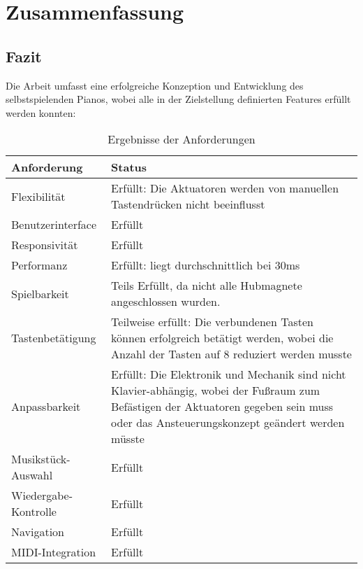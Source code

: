 
\chapter{Zusammenfassung} \label{fazit}

\section{Fazit}
Die Arbeit umfasst eine erfolgreiche Konzeption und Entwicklung des selbstspielenden Pianos, wobei alle in der Zielstellung
definierten Features erfüllt werden konnten: \newline

\begin{table}[htbp]
    \centering
    \begin{tabular}{|m{4cm}|m{8cm}|}
        \hline
        \textbf{Anforderung} &  \textbf{Status}  \\
        \hline
        Flexibilität & Erfüllt: Die Aktuatoren werden von manuellen Tastendrücken nicht beeinflusst \\
        \hline
        Benutzerinterface & Erfüllt \\
        \hline
        Responsivität & Erfüllt \\
        \hline
        Performanz & Erfüllt: liegt durchschnittlich bei 30ms \\
        \hline
        Spielbarkeit & Teils Erfüllt, da nicht alle Hubmagnete angeschlossen wurden. \\
        \hline
        Tastenbetätigung & Teilweise erfüllt: Die verbundenen Tasten können erfolgreich betätigt werden, wobei die Anzahl der Tasten auf
        8 reduziert werden musste \\
        \hline
        Anpassbarkeit & Erfüllt: Die Elektronik und Mechanik sind nicht Klavier-abhängig, wobei der Fußraum zum Befästigen der Aktuatoren
        gegeben sein muss oder das Ansteuerungskonzept geändert werden müsste\\
        \hline
        Musikstück-Auswahl & Erfüllt \\
        \hline
        Wiedergabe-Kontrolle & Erfüllt \\
        \hline
        Navigation & Erfüllt \\
        \hline
        MIDI-Integration & Erfüllt \\
        \hline
    \end{tabular}
    \caption{Ergebnisse der Anforderungen}
    \label{table:anorderungen-ergebnis}
\end{table}

